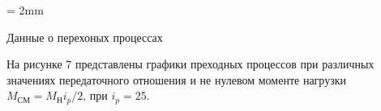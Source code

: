 \documentclass[a4paper, 12pt]{article}
\begin{document}
\begin{table}[h]
	\tabulinesep = 2mm
	\centering
    \begin{threeparttable}
        \caption{Данные о перехоных процессах }
    \end{threeparttable}
\end{table}
\newpage
На рисунке 7 представлены графики преходных процессов при различных значениях передаточного отношения и не нулевом моменте нагрузки $M_\text{СМ} = M_\text{Н}i_p/2$, при $i_p = 25$.
\end{document}
